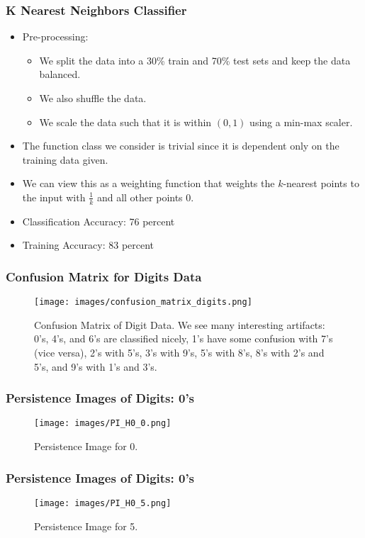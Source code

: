 		\begin{frame}
			\frametitle{K Nearest Neighbors Classifier}
			
			\begin{itemize}
				\item Pre-processing:
				\begin{itemize}
					\item We split the data into a 30\% train and 70\% test sets and keep the data balanced.
					\item We also shuffle the data.
					\item We scale the data such that it is within $(0,1)$ using a min-max scaler.
				\end{itemize}
				\item The function class we consider is trivial since it is dependent only on the training data given.
				\item We can view this as a weighting function that weights the $k$-nearest points to the input with $\frac{1}{k}$ and all other points $0$.
				\item Classification Accuracy: 76 percent
				\item Training Accuracy: 83 percent
			\end{itemize}
		\end{frame}
		
		\begin{frame}
			\frametitle{Confusion Matrix for Digits Data}
			
			\begin{figure}
				\centering
				\texttt{[image: images/confusion\_matrix\_digits.png]}
				\caption{Confusion Matrix of Digit Data. We see many interesting artifacts: 0's, 4's, and 6's are classified nicely, 1's have some confusion with 7's (vice versa), 2's with 5's, 3's with 9's, 5's with 8's, 8's with 2's and 5's, and 9's with 1's and 3's.}
		\end{figure}
		\end{frame}
		
		\begin{frame}
		\frametitle{Persistence Images of Digits: 0's}
		
		\begin{figure}
				\centering
				\texttt{[image: images/PI\_H0\_0.png]}
				\caption{Persistence Image for 0.}
		\end{figure}
		\end{frame}

		\begin{frame}
		\frametitle{Persistence Images of Digits: 0's}
		
		\begin{figure}
				\centering
				\texttt{[image: images/PI\_H0\_5.png]}
				\caption{Persistence Image for 5.}
		\end{figure}
		\end{frame}
		
